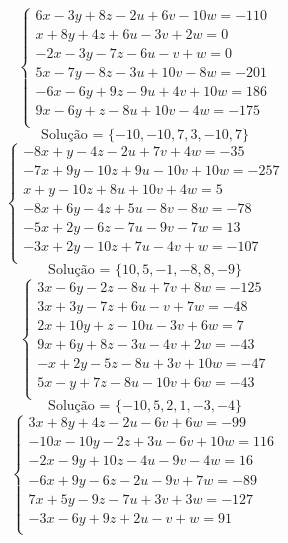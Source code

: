 \documentclass[12pt,oneside,a4paper]{article}
\begin{document}
\vspace{\baselineskip}
\begin{equation*}
\begin{cases}
6x-3y+8z-2u+6v-10w=-110 \\
x+8y+4z+6u-3v+2w=0 \\
-2x-3y-7z-6u-v+w=0 \\
5x-7y-8z-3u+10v-8w=-201 \\
-6x-6y+9z-9u+4v+10w=186 \\
9x-6y+z-8u+10v-4w=-175 \\
\end{cases}
\end{equation*}
\begin{equation*}
\text{Solução = }\{-10,-10,7,3,-10,7\}
\end{equation*}
\vspace{\baselineskip}
\begin{equation*}
\begin{cases}
-8x+y-4z-2u+7v+4w=-35 \\
-7x+9y-10z+9u-10v+10w=-257 \\
x+y-10z+8u+10v+4w=5 \\
-8x+6y-4z+5u-8v-8w=-78 \\
-5x+2y-6z-7u-9v-7w=13 \\
-3x+2y-10z+7u-4v+w=-107 \\
\end{cases}
\end{equation*}
\begin{equation*}
\text{Solução = }\{10,5,-1,-8,8,-9\}
\end{equation*}
\vspace{\baselineskip}
\begin{equation*}
\begin{cases}
3x-6y-2z-8u+7v+8w=-125 \\
3x+3y-7z+6u-v+7w=-48 \\
2x+10y+z-10u-3v+6w=7 \\
9x+6y+8z-3u-4v+2w=-43 \\
-x+2y-5z-8u+3v+10w=-47 \\
5x-y+7z-8u-10v+6w=-43 \\
\end{cases}
\end{equation*}
\begin{equation*}
\text{Solução = }\{-10,5,2,1,-3,-4\}
\end{equation*}
\vspace{\baselineskip}
\begin{equation*}
\begin{cases}
3x+8y+4z-2u-6v+6w=-99 \\
-10x-10y-2z+3u-6v+10w=116 \\
-2x-9y+10z-4u-9v-4w=16 \\
-6x+9y-6z-2u-9v+7w=-89 \\
7x+5y-9z-7u+3v+3w=-127 \\
-3x-6y+9z+2u-v+w=91 \\
\end{cases}
\end{equation*}
\end{document}
